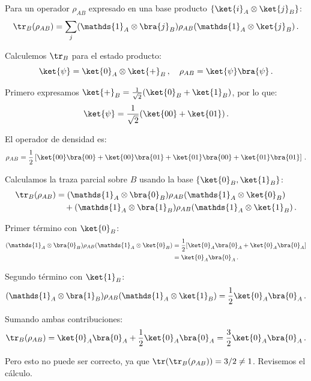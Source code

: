 \begin{defi}
  Para un operador $\rho_{AB}$ expresado en una base producto $\{\ket{i}_A \otimes \ket{j}_B\}$:
  \[
    \tr_B(\rho_{AB}) = \sum_j (\mathds{1}_A \otimes \bra{j}_B) \rho_{AB} (\mathds{1}_A \otimes \ket{j}_B)\,.
  \]
\end{defi}

\begin{eje}
  Calculemos $\tr_B$ para el estado producto:
  \[
    \ket{\psi} = \ket{0}_A \otimes \ket{+}_B\,, \quad
    \rho_{AB} = \ket{\psi}\bra{\psi}\,.
  \]

  Primero expresamos $\ket{+}_B = \frac{1}{\sqrt{2}}(\ket{0}_B + \ket{1}_B)$, por lo que:
  \[
    \ket{\psi} = \frac{1}{\sqrt{2}}(\ket{00} + \ket{01})\,.
  \]

  El operador de densidad es:
  \[
    \rho_{AB} = \frac{1}{2}\left[\ket{00}\bra{00} + \ket{00}\bra{01} + \ket{01}\bra{00} + \ket{01}\bra{01}\right]\,.
  \]

  Calculamos la traza parcial sobre $B$ usando la base $\{\ket{0}_B, \ket{1}_B\}$:
  \begin{align*}
    \tr_B(\rho_{AB}) & = (\mathds{1}_A \otimes \bra{0}_B)\rho_{AB}(\mathds{1}_A \otimes \ket{0}_B)          \\
                     & \quad + (\mathds{1}_A \otimes \bra{1}_B)\rho_{AB}(\mathds{1}_A \otimes \ket{1}_B)\,.
  \end{align*}

  Primer término con $\ket{0}_B$:
  \begin{align*}
    (\mathds{1}_A \otimes \bra{0}_B)\rho_{AB}(\mathds{1}_A \otimes \ket{0}_B)
     & = \frac{1}{2}[\ket{0}_A\bra{0}_A + \ket{0}_A\bra{0}_A] \\
     & = \ket{0}_A\bra{0}_A\,.
  \end{align*}

  Segundo término con $\ket{1}_B$:
  \[
    (\mathds{1}_A \otimes \bra{1}_B)\rho_{AB}(\mathds{1}_A \otimes \ket{1}_B) = \frac{1}{2}\ket{0}_A\bra{0}_A\,.
  \]

  Sumando ambas contribuciones:
  \[
    \tr_B(\rho_{AB}) = \ket{0}_A\bra{0}_A + \frac{1}{2}\ket{0}_A\bra{0}_A = \frac{3}{2}\ket{0}_A\bra{0}_A\,.
  \]

  Pero esto no puede ser correcto, ya que $\tr(\tr_B(\rho_{AB})) = 3/2 \neq 1$. Revisemos el cálculo.


\end{eje}
